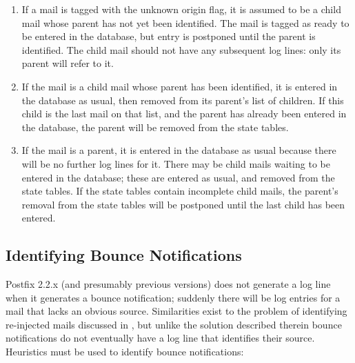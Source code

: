 \begin{enumerate}

    \item If a mail is tagged with the unknown origin flag, it is assumed
        to be a child mail whose parent has not yet been identified.  The
        mail is tagged as ready to be entered in the database, but entry is
        postponed until the parent is identified.  The child mail should
        not have any subsequent log lines: only its parent will refer to
        it.

    \item If the mail is a child mail whose parent has been identified, it
        is entered in the database as usual, then removed from its parent's
        list of children.  If this child is the last mail on that list, and
        the parent has already been entered in the database, the parent
        will be removed from the state tables.

    \item If the mail is a parent, it is entered in the database as usual
        because there will be no further log lines for it.  There may be
        child mails waiting to be entered in the database; these are
        entered as usual, and removed from the state tables.  If the state
        tables contain incomplete child mails, the parent's removal from
        the state tables will be postponed until the last child has been
        entered.

\end{enumerate}

\subsection{Identifying Bounce Notifications}

\label{identifying bounce notifications}

Postfix 2.2.x (and presumably previous versions) does not generate a log
line when it generates a bounce notification; suddenly there will be log
entries for a mail that lacks an obvious source.  Similarities exist to the
problem of identifying re-injected mails discussed in , but unlike the solution described therein bounce
notifications do not eventually have a log line that identifies their
source.  Heuristics must be used to identify bounce notifications:

